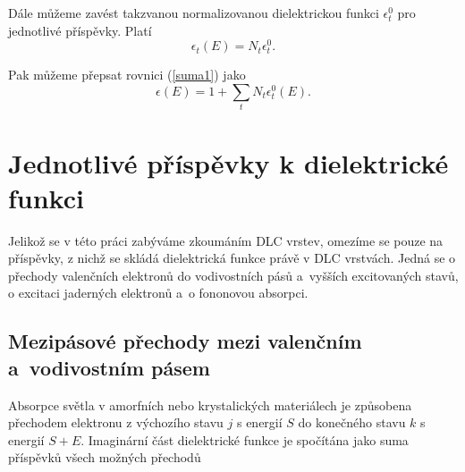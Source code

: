 Dále můžeme zavést takzvanou normalizovanou dielektrickou funkci $\epsilon_t^0$ pro jednotlivé příspěvky. Platí 
\begin{equation}
\epsilon_t(E) = N_t \epsilon_t^0  \text{.}
\end{equation}

Pak můžeme přepsat rovnici (\ref{suma1}) jako
\begin{equation}
\epsilon (E) = 1 + \sum_t N_t \epsilon_t^0(E) \text{.}
\end{equation}




\section{Jednotlivé příspěvky k dielektrické funkci}
Jelikož se v této práci zabýváme zkoumáním DLC vrstev, omezíme se pouze na příspěvky, z nichž se skládá dielektrická funkce právě v DLC vrstvách. Jedná se o přechody valenčních elektronů do vodivostních pásů a~vyšších excitovaných stavů, o excitaci jaderných elektronů a~o fononovou absorpci. 

\subsection{Mezipásové přechody mezi valenčním a~vodivostním pásem}
Absorpce světla v amorfních nebo krystalických materiálech je způsobena přechodem elektronu z výchozího stavu $j$ s energií $S$ do konečného stavu $k$ s energií $S + E$. Imaginární část dielektrické funkce je spočítána jako suma příspěvků všech možných přechodů

